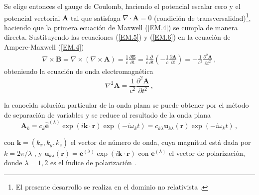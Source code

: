 Se elige entonces el gauge de Coulomb, haciendo el potencial escalar cero y el potencial vectorial $\mathbf{A}$ tal que satisfaga $\nabla \cdot \mathbf{A} = 0$ (condición de transversalidad)\footnote{El presente desarrollo se realiza en el dominio no relativista \cite{Agarwal_2012}.}, haciendo que la primera ecuación de Maxwell (\ref{EM.4}) se cumpla de manera directa. Sustituyendo las ecuaciones (\ref{EM.5}) y (\ref{EM.6})
en la ecuaci\'on de Ampere-Maxwell (\ref{EM.4})
\begin{align}
  \label{EM.7}
  \nabla \times \mathbf{B} = \nabla \times \left(\nabla\times\mathbf{A}\right)
  =\frac{1}{c}\frac{\partial \mathbf{E}}{\partial t} = \frac{1}{c}\frac{\partial}{\partial t} \left(-\frac{1}{c}\frac{\partial\mathbf{A}}{\partial t}\right) = -\frac{1}{c^{2}}\frac{\partial^{2}\mathbf{A}}{\partial t^{2}} \,,
\end{align}
obteniendo la ecuación de onda electromagnética
\begin{equation}
  \label{EM.8}
  \nabla^2 \mathbf{A} = \frac{1}{c^2} \frac{\partial^2 \mathbf{A}}{\partial t^2}\,,
\end{equation}

la conocida solución particular de la onda plana se puede obtener por el método de separación de variables y se reduce al resultado de la onda plana
\begin{equation}
  \label{EM.9}
  \mathbf{A}_k = c_k \mathbf{\hat{e}}^{(\lambda)}\exp{(i\mathbf{k}\cdot \mathbf{r})}\exp{(-i\omega_k t)} = c_{k\lambda}\mathbf{u}_{k\lambda}(\mathbf{r}) \exp{(-i\omega_k t)} \,,
\end{equation}

con $\mathbf{k} = (k_x, k_y, k_z)$ el vector de número de onda, cuya magnitud está dada por $k = 2\pi/\lambda$ \cite{Riley}, y $\mathbf{u}_{k\lambda}(\mathbf{r}) = \mathbf{e}^{(\lambda)} \exp{(i\mathbf{k}\cdot \mathbf{r})}$ con $\mathbf{e}^{(\lambda)}$ el vector de polarización, donde $\lambda=1,2$ es el índice de polarización \cite{Walls}.

